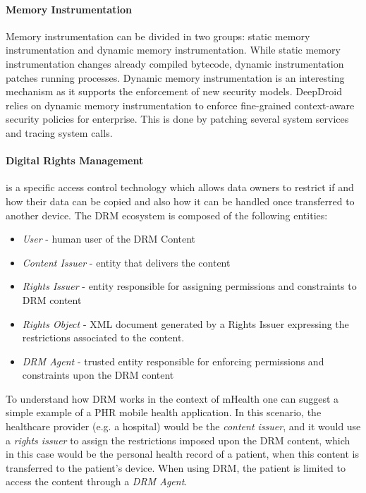 \paragraph{\textbf{Memory Instrumentation}}

Memory instrumentation can be divided in two groups: static memory instrumentation and dynamic memory instrumentation. While static memory instrumentation changes already compiled bytecode, dynamic instrumentation patches running processes. Dynamic memory instrumentation is an interesting mechanism as it supports the enforcement of new security models. DeepDroid~\cite{wang2015deepdroid} relies on dynamic memory instrumentation to enforce fine-grained context-aware security policies for enterprise.%
This is done by patching several system services and tracing system calls.

\paragraph{\textbf{Digital Rights Management}} is a specific access control technology which allows data owners to restrict if and how their data can be copied and also how it can be handled once transferred to another device. The \ac{DRM} ecosystem is composed of the following entities:

\begin{itemize}
	\item \emph{User} - human user of the DRM Content
	\item \emph{Content Issuer} - entity that delivers the content
	\item \emph{Rights Issuer} - entity responsible for assigning permissions and constraints to \ac{DRM} content
	\item \emph{Rights Object} - XML document generated by a Rights Issuer expressing the restrictions associated to the content.
	\item \emph{\ac{DRM} Agent} - trusted entity responsible for enforcing permissions and constraints upon the \ac{DRM} content
\end{itemize}

To understand how \ac{DRM} works in the context of mHealth one can suggest a simple example of a \ac{PHR} mobile health application. In this scenario, the healthcare provider (e.g. a hospital) would be the \emph{content issuer}, and it would use a \emph{rights issuer} to assign the restrictions imposed upon the \ac{DRM} content, which in this case would be the personal health record of a patient, when this content is transferred to the patient's device. When using \ac{DRM}, the patient is limited to access the content through a \emph{\ac{DRM} Agent}.

